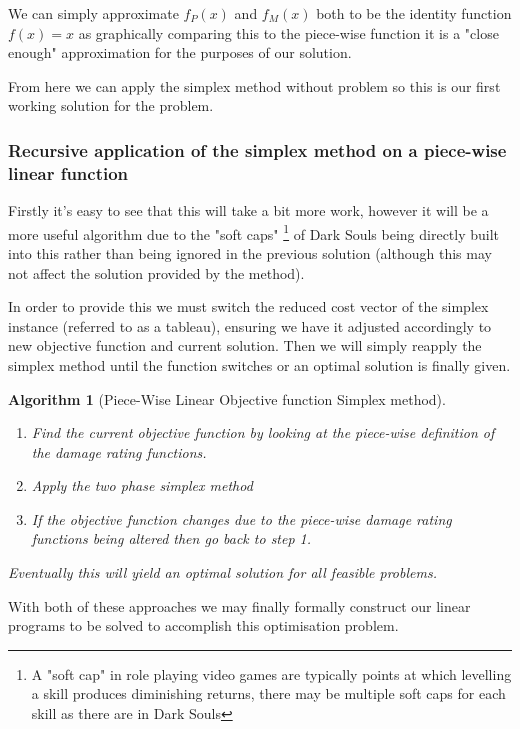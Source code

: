 \documentclass{article}
\newtheorem{algorithm}{Algorithm}[section]
\begin{document}
We can simply approximate $f_P(x)$ and $f_M(x)$ both to be the identity function $f(x) = x$ as graphically comparing this to the piece-wise function it is a "close enough" approximation for the purposes of our solution.

\par From here we can apply the simplex method without problem so this is our first working solution for the problem.

\subsubsection{Recursive application of the simplex method on a piece-wise linear function}
\par Firstly it's easy to see that this will take a bit more work, however it will be a more useful algorithm due to the "soft caps" \footnote{A "soft cap" in role playing video games are typically points at which levelling a skill produces diminishing returns, there may be multiple soft caps for each skill as there are in Dark Souls} of Dark Souls being directly built into this rather than being ignored in the previous solution (although this may not affect the solution provided by the method).

\par In order to provide this we must switch the reduced cost vector of the simplex instance (referred to as a tableau), ensuring we have it adjusted accordingly to new objective function and current solution. Then we will simply reapply the simplex method until the function switches or an optimal solution is finally given.

\begin{algorithm}[Piece-Wise Linear Objective function Simplex method]
~\\
    \begin{enumerate}
        \item Find the current objective function by looking at the piece-wise definition of the damage rating functions.
        \item Apply the two phase simplex method
        \item If the objective function changes due to the piece-wise damage rating functions being altered then go back to step 1.
    \end{enumerate}
    Eventually this will yield an optimal solution for all feasible problems.
\end{algorithm}

\par With both of these approaches we may finally formally construct our linear programs to be solved to accomplish this optimisation problem.
\end{document}

